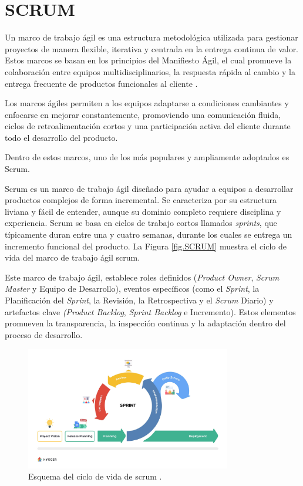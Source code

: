 \section{SCRUM}

Un marco de trabajo ágil es una estructura metodológica utilizada para gestionar proyectos de manera flexible, iterativa y centrada en la entrega continua de valor. Estos marcos se basan en los principios del Manifiesto Ágil, el cual promueve la colaboración entre equipos multidisciplinarios, la respuesta rápida al cambio y la entrega frecuente de productos funcionales al cliente \cite{beck2001manifesto}.

Los marcos ágiles permiten a los equipos adaptarse a condiciones cambiantes y enfocarse en mejorar constantemente, promoviendo una comunicación fluida, ciclos de retroalimentación cortos y una participación activa del cliente durante todo el desarrollo del producto.

Dentro de estos marcos, uno de los más populares y ampliamente adoptados es Scrum. 

Scrum es un marco de trabajo ágil diseñado para ayudar a equipos a desarrollar productos complejos de forma incremental. Se caracteriza por su estructura liviana y fácil de entender, aunque su dominio completo requiere disciplina y experiencia. Scrum se basa en ciclos de trabajo cortos llamados \textit{sprints}, que típicamente duran entre una y cuatro semanas, durante los cuales se entrega un incremento funcional del producto. La Figura \ref{fig.SCRUM} muestra el ciclo de vida del marco de trabajo ágil scrum.

Este marco de trabajo ágil, establece roles definidos (\textit{Product Owner}, \textit{Scrum Master} y Equipo de Desarrollo), eventos específicos (como el \textit{Sprint}, la Planificación del \textit{Sprint}, la Revisión, la Retrospectiva y el \textit{Scrum} Diario) y artefactos clave \textit{(Product Backlog}, \textit{Sprint Backlog} e Incremento). Estos elementos promueven la transparencia, la inspección continua y la adaptación dentro del proceso de desarrollo.


\begin{figure}[H]
    \centering
    \includegraphics[width=0.8\textwidth]{./img/metodologia/scrum.jpg}
    \caption{Esquema del ciclo de vida de scrum \cite{schwaber2020scrum2}.}
    \label{fig:CRISP-DM}
\end{figure}

